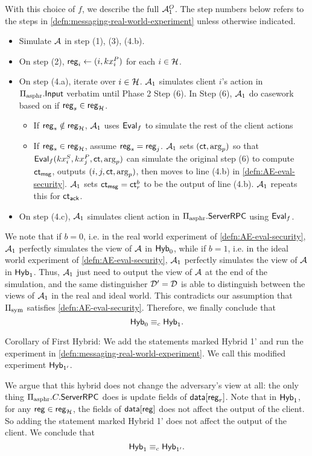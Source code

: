 With this choice of $f$, we describe the full $\mathcal{A}_1^O$. The step numbers below refers to the steps in \cref{defn:messaging-real-world-experiment} unless otherwise indicated.
\begin{itemize}
    \item Simulate $\mathcal{A}$ in step (1), (3), (4.b).
    \item On step (2), $\mathsf{reg}_i \leftarrow (i, kx_i^{P})$ for each $i \in \mathcal{H}$. 
    \item On step (4.a), iterate over $i \in \mathcal{H}$. $\mathcal{A}_1$ simulates client $i$'s action in $\Pi_{\text{asphr}}.\mathsf{Input}$ verbatim until Phase 2 Step (6). In Step (6), $\mathcal{A}_1$ do casework based on if $\mathsf{reg}_s \in \mathsf{reg}_{\mathcal{H}}$. 
    \begin{itemize}
        \item  If $\mathsf{reg}_s \notin \mathsf{reg}_{\mathcal{H}}$, $\mathcal{A}_1$ uses $\mathsf{Eval}_f$ to simulate the rest of the client actions
        \item  If $\mathsf{reg}_s \in \mathsf{reg}_{\mathcal{H}}$, assume $\mathsf{reg}_s = \mathsf{reg}_j$. $\mathcal{A}_1$ sets $(\mathsf{ct}, \arg_p)$ so that $\mathsf{Eval}_f(kx^S_i, kx^P_j, \mathsf{ct}, \arg_p)$ can simulate the original step (6) to compute $\mathsf{ct}_{\mathsf{msg}}$, outputs $(i, j, \mathsf{ct}, \arg_p)$, then moves to line (4.b) in \cref{defn:AE-eval-security}. $\mathcal{A}_1$ sets $\mathsf{ct}_{\mathsf{msg}} = \mathsf{ct}^b_r$ to be the output of line (4.b). $\mathcal{A}_1$ repeats this for $\mathsf{ct}_{\mathsf{ack}}$.
    \end{itemize}
   
    \item On step (4.c), $\mathcal{A}_1$ simulates client action in $\Pi_{\text{asphr}}.\mathsf{ServerRPC}$ using $\mathsf{Eval}_f$.
\end{itemize}
We note that if $b = 0$, i.e. in the real world experiment of \cref{defn:AE-eval-security}, $\mathcal{A}_1$ perfectly simulates the view of $\mathcal{A}$ in $\mathsf{Hyb}_0$, while if $b = 1$, i.e. in the ideal world experiment of \cref{defn:AE-eval-security}, $\mathcal{A}_1$ perfectly simulates the view of $\mathcal{A}$ in $\mathsf{Hyb}_1$. Thus, $\mathcal{A}_1$ just need to output the view of $\mathcal{A}$ at the end of the simulation, and the same distinguisher $\mathcal{D}' = \mathcal{D}$ is able to distinguish between the views of $\mathcal{A}_1$ in the real and ideal world. This contradicts our assumption that $\Pi_{\text{sym}}$ satisfies \cref{defn:AE-eval-security}. Therefore, we finally conclude that
$$\mathsf{Hyb}_0 \equiv_c \mathsf{Hyb}_1.$$

Corollary of First Hybrid: We add the statements marked Hybrid 1' and run the experiment in \cref{defn:messaging-real-world-experiment}. We call this modified experiment $\mathsf{Hyb}_{1'}$.

We argue that this hybrid does not change the adversary's view at all: the only thing $\Pi_{\text{asphr}}.C.\mathsf{ServerRPC}$ does is update fields of $\mathsf{data}[\mathsf{reg}_r]$. Note that in $\mathsf{Hyb}_1$, for any $\mathsf{reg} \in \mathsf{reg}_{\mathcal{H}}$, the fields of $\mathsf{data}[\mathsf{reg}]$ does not affect the output of the client. So adding the statement marked Hybrid 1' does not affect the output of the client. We conclude that
$$\mathsf{Hyb}_1 \equiv_c \mathsf{Hyb}_{1'}.$$

